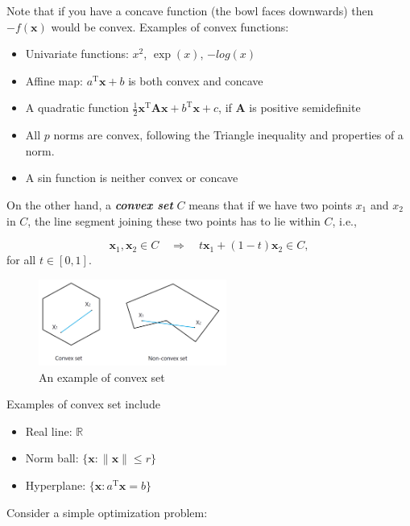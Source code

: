 \documentclass[
]{book}
\providecommand{\tightlist}{%
  \setlength{\itemsep}{0pt}\setlength{\parskip}{0pt}}
\theoremstyle{definition}
\theoremstyle{definition}
\theoremstyle{definition}
\theoremstyle{definition}
\theoremstyle{remark}
\begin{document}
Note that if you have a concave function (the bowl faces downwards) then \(-f(\mathbf{x})\) would be convex. Examples of convex functions:

\begin{itemize}
\tightlist
\item
  Univariate functions: \(x^2\), \(\exp(x)\), \(-log(x)\)
\item
  Affine map: \(a^\text{T}\mathbf{x}+ b\) is both convex and concave
\item
  A quadratic function \(\frac{1}{2}\mathbf{x}^\text{T}\mathbf{A}\mathbf{x}+ b^\text{T}\mathbf{x}+ c\), if \(\mathbf{A}\) is positive semidefinite
\item
  All \(p\) norms are convex, following the Triangle inequality and properties of a norm.
\item
  A sin function is neither convex or concave
\end{itemize}

On the other hand, a \textbf{\emph{convex set}} \(C\) means that if we have two points \(x_1\) and \(x_2\) in \(C\), the line segment joining these two points has to lie within \(C\), i.e.,

\[\mathbf{x}_1, \mathbf{x}_2 \in C \quad \Longrightarrow \quad t \mathbf{x}_1 + (1 - t) \mathbf{x}_2 \in C,\]
for all \(t \in [0, 1]\).

\begin{figure}
\centering
\includegraphics[width=0.55\textwidth,height=\textheight]{images/ConvexSet.png}
\caption{An example of convex set}
\end{figure}

Examples of convex set include

\begin{itemize}
\tightlist
\item
  Real line: \(\mathbb{R}\)
\item
  Norm ball: \(\{ \mathbf{x}: \lVert \mathbf{x}\rVert \leq r \}\)
\item
  Hyperplane: \(\{ \mathbf{x}: a^\text{T}\mathbf{x}= b \}\)
\end{itemize}

Consider a simple optimization problem:
\end{document}
